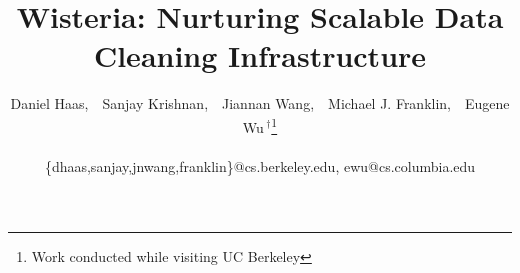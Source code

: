 \documentclass[english]{vldb}
\begin{document}

\linespread{1}%

\title{Wisteria: Nurturing Scalable Data Cleaning Infrastructure} 


\author{\large Daniel Haas,~~Sanjay Krishnan,~~Jiannan Wang,~~Michael J. Franklin,~~Eugene Wu{$\,^\dag$}\thanks{Work conducted while visiting UC Berkeley} \\
\vspace{.2em} \\
\fontsize{9}{10}\selectfont\ttfamily\upshape
\vspace{.1em}\{dhaas,sanjay,jnwang,franklin\}@cs.berkeley.edu, ewu@cs.columbia.edu
}

\newcommand{\squishlist}{
   \begin{list}{$\bullet$}
    { \setlength{\itemsep}{0pt}
      \setlength{\parsep}{2pt}
      \setlength{\topsep}{6pt}
      \setlength{\partopsep}{0pt}
      \leftmargin=5pt
\rightmargin=0pt
\labelsep=5pt
\labelwidth=10pt
\itemindent=0pt
\listparindent=0pt
\itemsep=\parsep
    }
}
\newcommand{\squishend}{\end{list}}





\newtheorem{theorem}{Theorem}
\newtheorem{example}{Example}
\newtheorem{definition}{Definition}
\newtheorem{proposition}{Proposition}
\newtheorem{lemma}{Lemma}
\newtheorem{corollary}{Corollary}
\newtheorem{demonstration}{Demonstration}

\newcommand{\dataset}{data set\xspace}
\newcommand{\datasets}{data sets\xspace}
\newcommand{\biascorrected}{NormalizedSC\xspace}
\newcommand{\bias}{\biascorrected}
\newcommand{\sampledirty}{{SampleDirty}\xspace}
\newcommand{\sampleclean}{{RawSC}\xspace}
\newcommand{\allclean}{{AllClean}\xspace}
\newcommand{\alldirty}{{AllDirty}\xspace}
\newcommand{\sys}{\textsf{Wisteria}\xspace}
\newcommand{\projx}{\sys}
\newcommand{\saqp}{SAQP\xspace}
\newcommand{\saqpplus}{\projx}
\newcommand{\blinkdb}{BlinkDB\xspace}
\newcommand{\ctable}{\ensuremath{T^{clean}}\xspace}
\newcommand{\var}{\ensuremath{\texttt{var}}\xspace}
\end{document}
